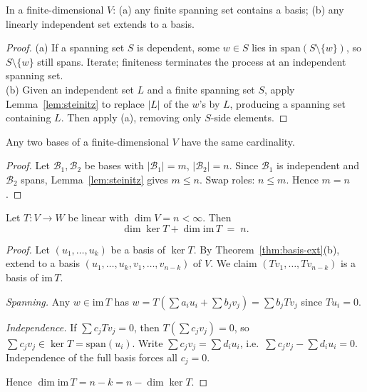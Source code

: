 \begin{theorem}\label{thm:basis-ext}
In a finite-dimensional $V$: (a) any finite spanning set contains a basis; (b) any linearly independent set extends to a basis.
\end{theorem}

\begin{proof}
(a) If a spanning set $S$ is dependent, some $w\in S$ lies in $\mathrm{span}(S\setminus\{w\})$, so $S\setminus\{w\}$ still spans. Iterate; finiteness terminates the process at an independent spanning set.\\
(b) Given an independent set $L$ and a finite spanning set $S$, apply Lemma~\ref{lem:steinitz} to replace $|L|$ of the $w$'s by $L$, producing a spanning set containing $L$. Then apply (a), removing only $S$-side elements.
\end{proof}

\begin{theorem}\label{thm:dim}
Any two bases of a finite-dimensional $V$ have the same cardinality.
\end{theorem}

\begin{proof}
Let $\mathcal{B}_1,\mathcal{B}_2$ be bases with $|\mathcal{B}_1|=m$, $|\mathcal{B}_2|=n$. Since $\mathcal{B}_1$ is independent and $\mathcal{B}_2$ spans, Lemma~\ref{lem:steinitz} gives $m\le n$. Swap roles: $n\le m$. Hence $m=n$.
\end{proof}

\begin{theorem}\label{thm:ranknul}
Let $T\colon V\to W$ be linear with $\dim V = n < \infty$. Then
\[
\dim \ker T + \dim \mathrm{im}\,T \;=\; n.
\]
\end{theorem}

\begin{proof}
Let $(u_1,\dots,u_k)$ be a basis of $\ker T$. By Theorem~\ref{thm:basis-ext}(b), extend to a basis $(u_1,\dots,u_k,v_1,\dots,v_{n-k})$ of $V$. We claim $(Tv_1,\dots,Tv_{n-k})$ is a basis of $\mathrm{im}\,T$.

\emph{Spanning.} Any $w\in\mathrm{im}\,T$ has $w = T(\sum a_i u_i + \sum b_j v_j) = \sum b_j Tv_j$ since $Tu_i = 0$.

\emph{Independence.} If $\sum c_j Tv_j = 0$, then $T(\sum c_j v_j) = 0$, so $\sum c_j v_j \in \ker T = \mathrm{span}(u_i)$. Write $\sum c_j v_j = \sum d_i u_i$, i.e.\ $\sum c_j v_j - \sum d_i u_i = 0$. Independence of the full basis forces all $c_j = 0$.

Hence $\dim \mathrm{im}\,T = n-k = n - \dim \ker T$.
\end{proof}

